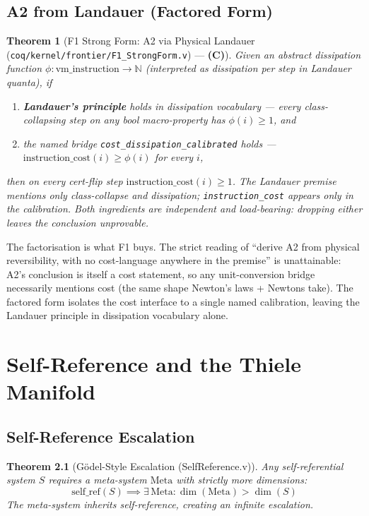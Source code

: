 \documentclass[11pt, a4paper]{report}
\theoremstyle{definition}
\theoremstyle{plain}
\newtheorem{theorem}{Theorem}[chapter]
\newcommand{\N}{\mathbb{N}}
\begin{document}
\section{A2 from Landauer (Factored Form)}

\begin{theorem}[F1 Strong Form: A2 via Physical Landauer {\normalfont (\texttt{coq/kernel/frontier/F1\_StrongForm.v})} --- \textbf{(C)}]
\label{thm:f1_strong_form}
Given an abstract dissipation function $\phi : \mathrm{vm\_instruction} \to \N$ (interpreted as dissipation per step in Landauer quanta), if
\begin{enumerate}
    \item \textbf{Landauer's principle} holds in dissipation vocabulary --- every class-collapsing step on any bool macro-property has $\phi(i) \geq 1$, and
    \item the named bridge \texttt{cost\_dissipation\_calibrated} holds --- $\mathrm{instruction\_cost}(i) \geq \phi(i)$ for every $i$,
\end{enumerate}
then on every cert-flip step $\mathrm{instruction\_cost}(i) \geq 1$. The Landauer premise mentions only class-collapse and dissipation; \texttt{instruction\_cost} appears only in the calibration. Both ingredients are independent and load-bearing: dropping either leaves the conclusion unprovable.
\end{theorem}

The factorisation is what F1 buys. The strict reading of ``derive A2 from physical reversibility, with no cost-language anywhere in the premise'' is unattainable: A2's conclusion is itself a cost statement, so any unit-conversion bridge necessarily mentions cost (the same shape Newton's laws + Newtons take). The factored form isolates the cost interface to a single named calibration, leaving the Landauer principle in dissipation vocabulary alone.

\chapter{Self-Reference and the Thiele Manifold}

\section{Self-Reference Escalation}

\begin{theorem}[G\"odel-Style Escalation {\normalfont (SelfReference.v)}]
Any self-referential system $S$ requires a meta-system $\mathrm{Meta}$ with strictly more dimensions:
\[ \mathrm{self\_ref}(S) \implies \exists\, \mathrm{Meta}: \dim(\mathrm{Meta}) > \dim(S) \]
The meta-system inherits self-reference, creating an infinite escalation.
\end{theorem}
\end{document}
